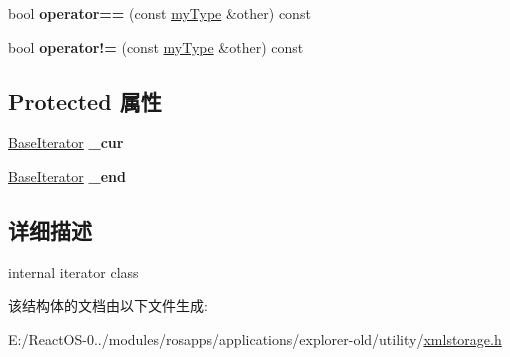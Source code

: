 \begin{DoxyCompactItemize}
\item 
\mbox{\label{struct_x_m_l_storage_1_1_x_m_l_property_reader_1_1const__iterator_a39e9567df4a894402a3de523976874d7}} 
bool {\bfseries operator==} (const \hyperlink{struct_x_m_l_storage_1_1_x_m_l_property_reader_1_1const__iterator}{my\+Type} \&other) const
\item 
\mbox{\label{struct_x_m_l_storage_1_1_x_m_l_property_reader_1_1const__iterator_aa37d8ea77acc814cf007d44e150aa589}} 
bool {\bfseries operator!=} (const \hyperlink{struct_x_m_l_storage_1_1_x_m_l_property_reader_1_1const__iterator}{my\+Type} \&other) const
\end{DoxyCompactItemize}
\subsection*{Protected 属性}
\begin{DoxyCompactItemize}
\item 
\mbox{\label{struct_x_m_l_storage_1_1_x_m_l_property_reader_1_1const__iterator_a9cec983c6de3a66aea4d770aac1ada97}} 
\hyperlink{struct_x_m_l_storage_1_1const___x_m_l_children_filter_1_1const__iterator}{Base\+Iterator} {\bfseries \+\_\+cur}
\item 
\mbox{\label{struct_x_m_l_storage_1_1_x_m_l_property_reader_1_1const__iterator_a58de81f3ae8fc04c6388492cd0b6e62b}} 
\hyperlink{struct_x_m_l_storage_1_1const___x_m_l_children_filter_1_1const__iterator}{Base\+Iterator} {\bfseries \+\_\+end}
\end{DoxyCompactItemize}


\subsection{详细描述}
internal iterator class 

该结构体的文档由以下文件生成\+:\begin{DoxyCompactItemize}
\item 
E\+:/\+React\+O\+S-\/0../modules/rosapps/applications/explorer-\/old/utility/\hyperlink{xmlstorage_8h}{xmlstorage.\+h}\end{DoxyCompactItemize}
